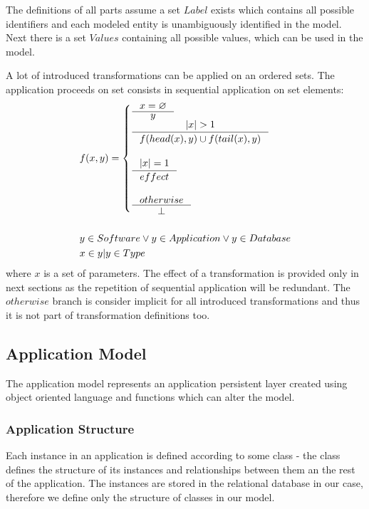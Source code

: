 \documentclass[11pt]{article}
\begin{document}
The definitions of all parts assume a set $Label$ exists which contains all possible identifiers and each modeled entity is unambiguously identified in the model. Next there is a set $Values$ containing all possible values, which can be used in the model. 

A lot of introduced transformations can be applied on an ordered sets. The application proceeds on set consists in sequential application on set elements:
\begin{align*}
& 	f(x, y) = \begin{cases}
 		\inference{x = \varnothing}{y}\\
 		\inference{|x| > 1}{f(head(x), y) \cup f(tail(x), y)}\\\\
 		\inference{|x| = 1}{effect}\\\\
 		\inference{otherwise}{\perp}
 \end{cases}\\\\
& y \in Software \vee y \in Application \vee y \in Database \\
& x \in {y | y \in Type}
\end{align*}
where $x$ is a set of parameters. The effect of a transformation is provided only in next sections as the repetition of sequential application will be redundant. The $otherwise$ branch is consider implicit for all introduced transformations and thus it is not part of transformation definitions too. 


\subsection{Application Model}
\label{sec:appModel}
The application model represents an application persistent layer created using object oriented language and functions which can alter the model. 
\subsubsection{Application Structure}
Each instance in an application is defined according to some class - the class defines the structure of its instances and relationships between them an the rest of the application. The instances are stored in the relational database in our case, therefore we define only the structure of classes in our model. 
\end{document}
